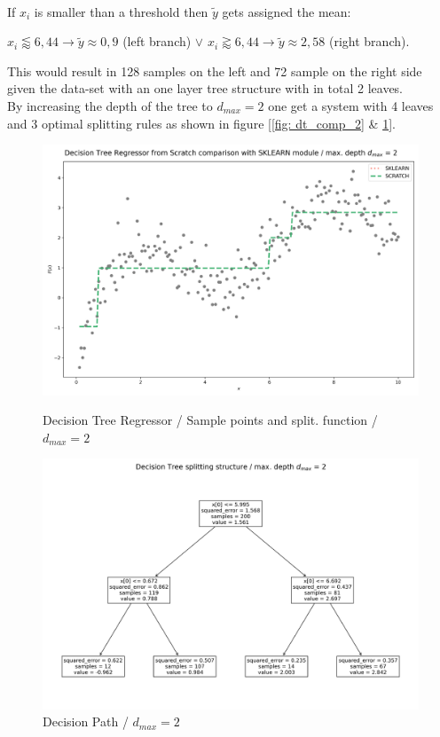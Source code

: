 \documentclass[12pt, a4paper]{article}
\begin{document}
\\
If $x_i$ is smaller than a threshold then $\tilde{y}$ gets assigned the mean:
\begin{center}
    $x_i \lessapprox 6,44 \rightarrow \tilde{y} \approx 0,9$ (left branch) $\vee$ $x_i \gtrapprox 6,44 \rightarrow \tilde{y} \approx 2,58$ (right branch). 
\end{center}
This would result in 128 samples on the left and 72 sample on the right side given the data-set with an one layer tree structure with in total 2 leaves. \\
By increasing the depth of the tree to $d_{max} = 2$ one get a system with 4 leaves and 3 optimal splitting rules as shown in figure [\ref{fig: dt_comp_2} \& \ref{fig: dt_split_2}].
\begin{figure}[htbp]
\begin{minipage}[t]{7cm}
\vspace{0pt}
\centering
\includegraphics[width=1\textwidth,trim={0 0 0 0},clip]{figures/decision_tree_regressor_comparison_md=2.png}
\caption[Decision Tree Regressor / Two Layers]{Decision Tree Regressor / Sample points and split. function / $d_{max} = 2$}
\label{fig: dt_comp_2}  
\end{minipage}
\hfill
\begin{minipage}[t]{6cm}
\vspace{0pt}
\centering
\includegraphics[width=1\textwidth,trim={0 0 0 0},clip]{figures/decision_tree_splitting_structure_md=2.png}
\caption[Decision Path / Two Layers]{Decision Path / $d_{max} = 2$}
\label{fig: dt_split_2} 
\end{minipage}
\end{figure}
\end{document}
